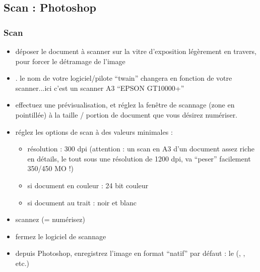 \documentclass[a4paper,12pt,french]{sphinxmanual}
\begin{document}
\subsection{Scan : Photoshop}
\label{psd/scan+assemblage_psd+gimp+autopano:scan-psd}

\subsubsection{Scan}
\label{psd/scan+assemblage_psd+gimp+autopano:scan}\begin{itemize}
\item {} 
déposer le document à scanner sur la vitre d'exposition légèrement en travers, pour forcer le détramage de l'image

\item {} 
 . le nom de votre logiciel/pilote ``twain'' changera en fonction de votre scanner...ici c'est un scanner A3 ``EPSON GT10000+''

\item {} 
effectuez une prévisualisation, et réglez la fenêtre de scannage (zone en pointillée) à la taille / portion de document que vous désirez numériser.

\item {} 
réglez les options de scan à des valeurs minimales :
\begin{itemize}
\item {} 
résolution : 300 dpi (attention : un scan en A3 d'un document assez riche en détails, le tout sous une résolution de 1200 dpi, va ``peser'' facilement 350/450 MO !)

\item {} 
si document en couleur : 24 bit couleur

\item {} 
si document au trait : noir et blanc

\end{itemize}

\item {} 
scannez (= numérisez)

\item {} 
fermez le logiciel de scannage

\item {} 
depuis Photoshop, enregistrez l'image  en format ``natif'' par défaut : le  (, , etc.)

\end{itemize}
\end{document}

